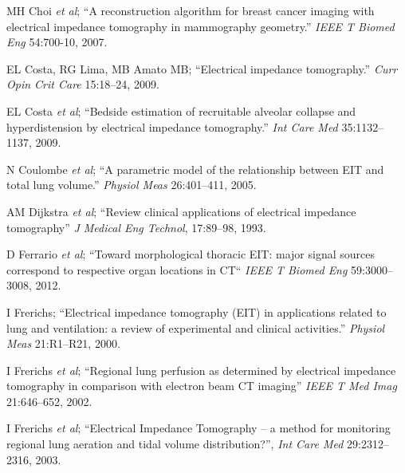 \documentclass[10pt,journal]{IEEEtran}\def\TBLWIDA{15mm}\def\TBLWIDB{60mm}
\newcommand{\ifmaxthree}[2]{#2 {\em et al}; }
\begin{document}
\begin{thebibliography}{00}
\ifmaxthree{
MH Choi, TJ Kao, D Isaacson, GJ Saulnier, JC Newell
}{
MH Choi
}
``A reconstruction algorithm for breast cancer imaging with electrical impedance tomography in mammography geometry.''
{\em IEEE T Biomed Eng} 54:700-10, 2007. %

EL Costa, RG Lima, MB Amato MB;
``Electrical impedance tomography.''
{\em Curr Opin Crit Care} 15:18--24, 2009.

\ifmaxthree{
EL Costa, JB Borges, A Melo, F Suarez-Sipmann, C Toufen Jr., SH Böhm, MB Amato
}{
EL Costa
}
``Bedside estimation of recruitable alveolar collapse and hyperdistension by electrical
impedance tomography.''
{\em Int Care Med} 35:1132--1137, 2009.

\ifmaxthree{
N Coulombe, H Gagnon, F Marquis, Y Skrobik, R Guardo
}{
N Coulombe
}
``A parametric model of the relationship between EIT and total lung volume.''
{\em  Physiol Meas} 26:401--411, 2005.


\ifmaxthree{
AM Dijkstra, BH Brown, AD Leathard, ND Harris, DC Barber, DL Edbrooke,
}{
AM Dijkstra
}
``Review clinical applications of electrical impedance tomography''
{\em J Medical Eng Technol}, 17:89--98, 1993.

\ifmaxthree{
D Ferrario, B Grychtol, A Adler, J Sola, SH Böhm, M Bodenstein
}{
D Ferrario
}
``Toward morphological thoracic EIT: major signal sources correspond to respective organ locations in CT``
{\em  IEEE T Biomed Eng} 59:3000--3008, 2012.

I Frerichs;
``Electrical impedance tomography (EIT) in applications related to lung and ventilation: a review of experimental and clinical activities.''
{\em  Physiol Meas} 21:R1--R21, 2000.

\ifmaxthree{
I Frerichs, J Hinz, P Herrmann, G Weisser, G Hahn, M Quintel, G Hellige.
}{
I Frerichs
}
``Regional lung  perfusion  as  determined  by  electrical
  impedance  tomography  in  comparison  with  electron beam CT imaging''
{\em IEEE T Med Imag} 21:646--652, 2002.

\ifmaxthree{
I Frerichs, PA Dargavillle, T Dudykevych, PM Rimensberger,
}{
I Frerichs
}
``Electrical Impedance Tomography -- a method for monitoring
   regional lung aeration and tidal volume distribution?'',
{\em Int Care Med} 29:2312--2316, 2003.




\end{thebibliography}
\end{document}
